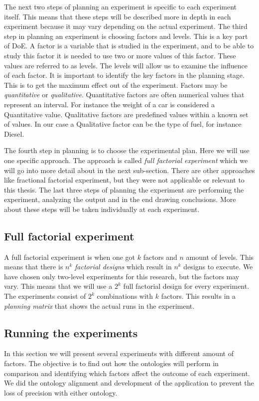 \documentclass{llncs}
\begin{document}
The next two steps of planning an experiment is specific to each
experiment itself. This means that these steps will be described more
in depth in each experiment because it may vary depending on the
actual experiment.  The third step in planning an experiment is
choosing factors and levels. This is a key part of DoE. A factor is a
variable that is studied in the experiment, and to be able to study
this factor it is needed to use two or more values of this
factor. These values are referred to as levels.  The levels will allow
us to examine the influence of each factor. It is important to
identify the key factors in the planning stage. This is to get the
maximum effect out of the experiment.  Factors may be
\emph{quantitative} or \emph{qualitative}. Quantitative factors
are often numerical values that represent an interval. For instance
the weight of a car is considered a Quantitative value. Qualitative
factors are predefined values within a known set of values.  In our
case a Qualitative factor can be the type of fuel, for instance
Diesel.

The fourth step in planning is to choose the experimental plan. Here
we will use one specific approach. The approach is called \emph{full
  factorial experiment} which we will go into more detail about in the
next sub-section. There are other approaches like fractional factorial
experiment, but they were not applicable or relevant to this thesis.
The last three steps of planning the experiment are performing the
experiment, analyzing the output and in the end drawing
conclusions. More about these steps will be taken individually at each
experiment. 


\subsection{Full factorial experiment}
A full factorial experiment is when one got $k$ factors and $n$ amount
of levels. This means that there is $n^k$ \emph{factorial designs}
which result in $n^k$ designs to execute.  We have chosen only
two-level experiments for this research, but the factors may
vary. This means that we will use a $2^k$ full factorial design for
every experiment. The experiments consist of $2^k$ combinations with
$k$ factors. This results in a \emph{planning matrix} that shows the
actual runs in the experiment.




\subsection{Running the experiments}
In this section we will present several experiments with different
amount of factors.  The objective is to find out how the ontologies
will perform in comparison and identifying which factors affect the
outcome of each experiment. We did the ontology alignment and
development of the application to prevent the loss of precision with
either ontology.
\end{document}
